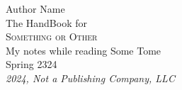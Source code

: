 \begin{titlepage}
	\raggedleft{}
	{\Large Author Name\\[1in]}
	{\large The HandBook for\\}
	{\Huge\scshape Something or Other\\[.2in]}
	{\large My notes while reading Some Tome\\}
	{\large Spring 2324\\}
	\vfill
	{\itshape 2024, Not a Publishing Company, LLC}
\end{titlepage}
